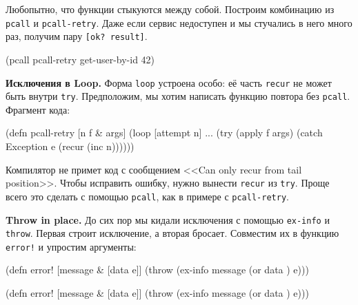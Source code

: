 Любопытно, что функции стыкуются между собой. Построим комбинацию из
\verb|pcall| и \verb|pcall-retry|. Даже если сервис недоступен и мы
стучались в него много раз, получим пару \verb|[ok? result]|.

\begin{english}
  \begin{clojure}
(pcall pcall-retry get-user-by-id 42)
  \end{clojure}
\end{english}

\textbf{Исключения в Loop.} Форма \verb|loop| устроена особо: её часть
\verb|recur| не может быть внутри \verb|try|. Предположим, мы хотим написать
функцию повтора без \verb|pcall|. Фрагмент кода:


\begin{english}
  \begin{clojure}
(defn pcall-retry [n f & args]
  (loop [attempt n]
    ...
    (try
      (apply f args)
      (catch Exception e
        (recur (inc n))))))
  \end{clojure}
\end{english}

Компилятор не примет код с сообщением <<Can only recur from tail
position>>. Чтобы исправить ошибку, нужно вынести \verb|recur| из
\verb|try|. Проще всего это сделать с помощью \verb|pcall|, как в примере с
\verb|pcall-retry|.

\textbf{Throw in place.} До сих пор мы кидали исключения с помощью
\verb|ex-info| и \verb|throw|. Первая строит исключение, а вторая
бросает. Совместим их в функцию \verb|error!| и упростим аргументы:


\ifx\DEVICETYPE\MOBILE

\begin{english}
  \begin{clojure}
(defn error! [message & [data e]]
  (throw (ex-info message
           (or data {}) e)))
  \end{clojure}
\end{english}

\else

\begin{english}
  \begin{clojure}
(defn error! [message & [data e]]
  (throw (ex-info message (or data {}) e)))
  \end{clojure}
\end{english}


